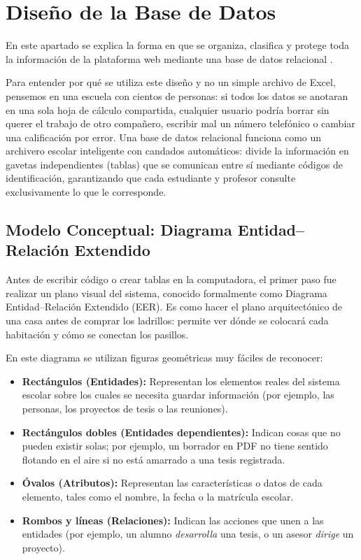 \section{Diseño de la Base de Datos}
\label{sec:diseno_bd}

En este apartado se explica la forma en que se organiza, clasifica y protege toda la información de la plataforma web mediante una base de datos relacional \parencite{silberschatz2014}. 

Para entender por qué se utiliza este diseño y no un simple archivo de Excel, pensemos en una escuela con cientos de personas: si todos los datos se anotaran en una sola hoja de cálculo compartida, cualquier usuario podría borrar sin querer el trabajo de otro compañero, escribir mal un número telefónico o cambiar una calificación por error. Una base de datos relacional funciona como un archivero escolar inteligente con candados automáticos: divide la información en gavetas independientes (tablas) que se comunican entre sí mediante códigos de identificación, garantizando que cada estudiante y profesor consulte exclusivamente lo que le corresponde.

\subsection{Modelo Conceptual: Diagrama Entidad--Relación Extendido}
\label{subsec:diagrama_eer}

Antes de escribir código o crear tablas en la computadora, el primer paso fue realizar un plano visual del sistema, conocido formalmente como Diagrama Entidad--Relación Extendido (EER). Es como hacer el plano arquitectónico de una casa antes de comprar los ladrillos: permite ver dónde se colocará cada habitación y cómo se conectan los pasillos.

En este diagrama se utilizan figuras geométricas muy fáciles de reconocer:
\begin{itemize}
    \item \textbf{Rectángulos (Entidades):} Representan los elementos reales del sistema escolar sobre los cuales se necesita guardar información (por ejemplo, las personas, los proyectos de tesis o las reuniones).
    \item \textbf{Rectángulos dobles (Entidades dependientes):} Indican cosas que no pueden existir solas; por ejemplo, un borrador en PDF no tiene sentido flotando en el aire si no está amarrado a una tesis registrada.
    \item \textbf{Óvalos (Atributos):} Representan las características o datos de cada elemento, tales como el nombre, la fecha o la matrícula escolar.
    \item \textbf{Rombos y líneas (Relaciones):} Indican las acciones que unen a las entidades (por ejemplo, un alumno \textit{desarrolla} una tesis, o un asesor \textit{dirige} un proyecto).
\end{itemize}

